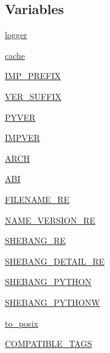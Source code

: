 \subsection*{Variables}
\begin{DoxyCompactItemize}
\item 
\hyperlink{namespacepip_1_1__vendor_1_1distlib_1_1wheel_a7ad22b151a9cfd5f51f879e788460167}{logger}
\item 
\hyperlink{namespacepip_1_1__vendor_1_1distlib_1_1wheel_a204fa74804a14f7f4345f222e742c966}{cache}
\item 
\hyperlink{namespacepip_1_1__vendor_1_1distlib_1_1wheel_a30c27f3c60ddc24856ba6197a82da151}{I\+M\+P\+\_\+\+P\+R\+E\+F\+IX}
\item 
\hyperlink{namespacepip_1_1__vendor_1_1distlib_1_1wheel_a5a04dd1fa571ceca4ffddeb531079cb1}{V\+E\+R\+\_\+\+S\+U\+F\+F\+IX}
\item 
\hyperlink{namespacepip_1_1__vendor_1_1distlib_1_1wheel_af019298677dc5f20a9f3b11ed6fe337e}{P\+Y\+V\+ER}
\item 
\hyperlink{namespacepip_1_1__vendor_1_1distlib_1_1wheel_ae6c46cca17d55c75a1391e0ba578031d}{I\+M\+P\+V\+ER}
\item 
\hyperlink{namespacepip_1_1__vendor_1_1distlib_1_1wheel_aa7cd2e9574c483b6e672501a5e4bac71}{A\+R\+CH}
\item 
\hyperlink{namespacepip_1_1__vendor_1_1distlib_1_1wheel_a27038ba5fe0a4614086ac7b7c3fb96fa}{A\+BI}
\item 
\hyperlink{namespacepip_1_1__vendor_1_1distlib_1_1wheel_a1f9bbff12f1c553d5692450e00779e5c}{F\+I\+L\+E\+N\+A\+M\+E\+\_\+\+RE}
\item 
\hyperlink{namespacepip_1_1__vendor_1_1distlib_1_1wheel_a4130d157f020fb1d874d2d4fe7f90145}{N\+A\+M\+E\+\_\+\+V\+E\+R\+S\+I\+O\+N\+\_\+\+RE}
\item 
\hyperlink{namespacepip_1_1__vendor_1_1distlib_1_1wheel_a3b17a6d59fb8e184a1a9ce9f0cbde4ad}{S\+H\+E\+B\+A\+N\+G\+\_\+\+RE}
\item 
\hyperlink{namespacepip_1_1__vendor_1_1distlib_1_1wheel_a395280bb0ac57ef7d81f73c9f038f714}{S\+H\+E\+B\+A\+N\+G\+\_\+\+D\+E\+T\+A\+I\+L\+\_\+\+RE}
\item 
\hyperlink{namespacepip_1_1__vendor_1_1distlib_1_1wheel_a44ee0402253a6c95e59d21ef4d164849}{S\+H\+E\+B\+A\+N\+G\+\_\+\+P\+Y\+T\+H\+ON}
\item 
\hyperlink{namespacepip_1_1__vendor_1_1distlib_1_1wheel_aeaa9543084b5576b565272d96a037dc0}{S\+H\+E\+B\+A\+N\+G\+\_\+\+P\+Y\+T\+H\+O\+NW}
\item 
\hyperlink{namespacepip_1_1__vendor_1_1distlib_1_1wheel_a23c6d2886005ba4ef8af4ba8b9560c64}{to\+\_\+posix}
\item 
\hyperlink{namespacepip_1_1__vendor_1_1distlib_1_1wheel_a6315b17a70ce9bac693101eb0c6a0289}{C\+O\+M\+P\+A\+T\+I\+B\+L\+E\+\_\+\+T\+A\+GS}
\end{DoxyCompactItemize}


